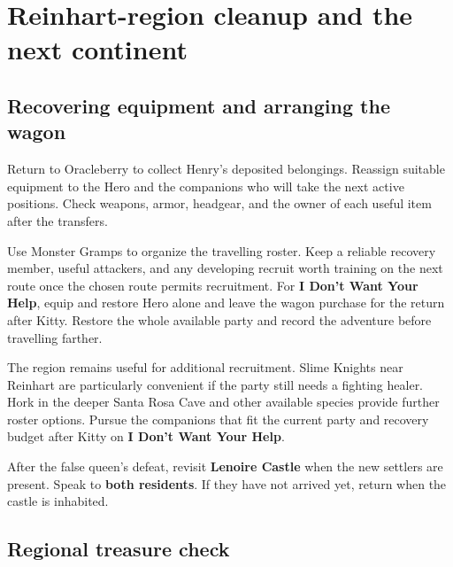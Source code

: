 \section{Reinhart-region cleanup and the next continent}

\subsection*{Recovering equipment and arranging the wagon}

Return to Oracleberry to collect Henry's deposited belongings. Reassign
suitable equipment to the Hero and the companions who will take the
next active positions. Check weapons, armor, headgear, and the owner
of each useful item after the transfers.

Use Monster Gramps to organize the travelling roster. Keep a reliable
recovery member, useful attackers, and any developing recruit worth
training on the next route once the chosen route permits recruitment.
For \textbf{I Don't Want Your Help}, equip and restore Hero alone and
leave the wagon purchase for the return after Kitty. Restore the whole available party and
record the adventure before travelling farther.

The region remains useful for additional recruitment. Slime Knights
near Reinhart are particularly convenient if the party still needs
a fighting healer. Hork in the deeper Santa Rosa Cave and other available
species provide further roster options. Pursue the companions that
fit the current party and recovery budget after Kitty on
\textbf{I Don't Want Your Help}.

After the false queen's defeat, revisit \textbf{Lenoire Castle} when
the new settlers are present. Speak to \textbf{both residents}. If they
have not arrived yet, return when the castle is inhabited.


\subsection*{Regional treasure check}

